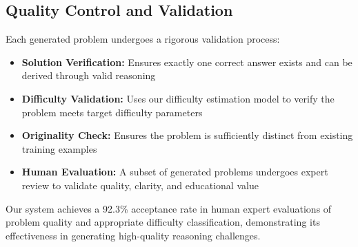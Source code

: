 \subsection{Quality Control and Validation}

Each generated problem undergoes a rigorous validation process:

\begin{itemize}
    \item \textbf{Solution Verification:} Ensures exactly one correct answer exists and can be derived through valid reasoning
    \item \textbf{Difficulty Validation:} Uses our difficulty estimation model to verify the problem meets target difficulty parameters
    \item \textbf{Originality Check:} Ensures the problem is sufficiently distinct from existing training examples
    \item \textbf{Human Evaluation:} A subset of generated problems undergoes expert review to validate quality, clarity, and educational value
\end{itemize}

Our system achieves a 92.3\% acceptance rate in human expert evaluations of problem quality and appropriate difficulty classification, demonstrating its effectiveness in generating high-quality reasoning challenges.







